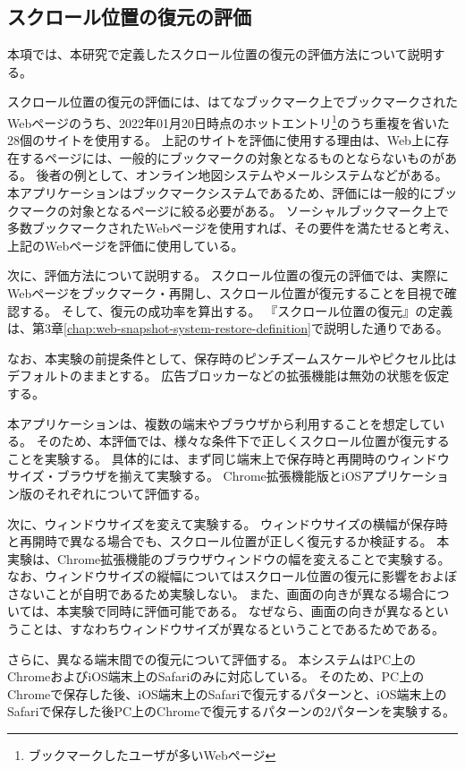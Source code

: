 \subsection{スクロール位置の復元の評価}
本項では、本研究で定義したスクロール位置の復元の評価方法について説明する。

スクロール位置の復元の評価には、はてなブックマーク上でブックマークされたWebページのうち、2022年01月20日時点のホットエントリ\footnote{ブックマークしたユーザが多いWebページ}のうち重複を省いた28個のサイトを使用する。
上記のサイトを評価に使用する理由は、Web上に存在するページには、一般的にブックマークの対象となるものとならないものがある。
後者の例として、オンライン地図システムやメールシステムなどがある。
本アプリケーションはブックマークシステムであるため、評価には一般的にブックマークの対象となるページに絞る必要がある。
ソーシャルブックマーク上で多数ブックマークされたWebページを使用すれば、その要件を満たせると考え、上記のWebページを評価に使用している。


次に、評価方法について説明する。
スクロール位置の復元の評価では、実際にWebページをブックマーク・再開し、スクロール位置が復元することを目視で確認する。
そして、復元の成功率を算出する。
『スクロール位置の復元』の定義は、第3章\ref{chap:web-snapshot-system-restore-definition}で説明した通りである。

なお、本実験の前提条件として、保存時のピンチズームスケールやピクセル比はデフォルトのままとする。
広告ブロッカーなどの拡張機能は無効の状態を仮定する。

本アプリケーションは、複数の端末やブラウザから利用することを想定している。
そのため、本評価では、様々な条件下で正しくスクロール位置が復元することを実験する。
具体的には、まず同じ端末上で保存時と再開時のウィンドウサイズ・ブラウザを揃えて実験する。
Chrome拡張機能版とiOSアプリケーション版のそれぞれについて評価する。

次に、ウィンドウサイズを変えて実験する。
ウィンドウサイズの横幅が保存時と再開時で異なる場合でも、スクロール位置が正しく復元するか検証する。
本実験は、Chrome拡張機能のブラウザウィンドウの幅を変えることで実験する。
なお、ウィンドウサイズの縦幅についてはスクロール位置の復元に影響をおよぼさないことが自明であるため実験しない。
また、画面の向きが異なる場合については、本実験で同時に評価可能である。
なぜなら、画面の向きが異なるということは、すなわちウィンドウサイズが異なるということであるためである。

さらに、異なる端末間での復元について評価する。
本システムはPC上のChromeおよびiOS端末上のSafariのみに対応している。
そのため、PC上のChromeで保存した後、iOS端末上のSafariで復元するパターンと、iOS端末上のSafariで保存した後PC上のChromeで復元するパターンの2パターンを実験する。

